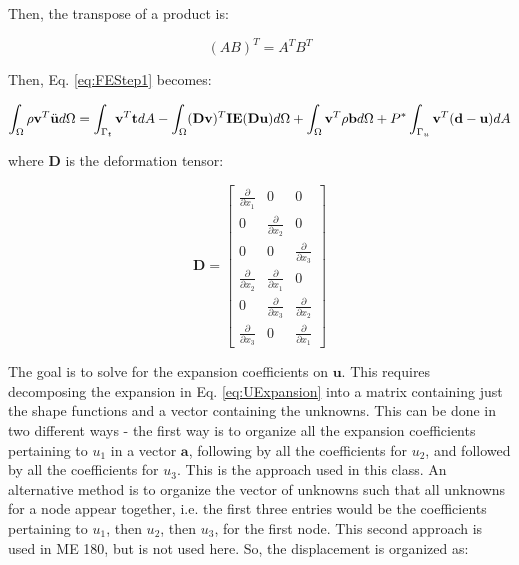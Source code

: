 \documentclass[10pt]{article}
\begin{document}
Then, the transpose of a product is:

\begin{equation}
(AB)^T=A^TB^T
\end{equation}


Then, Eq. \eqref{eq:FEStep1} becomes:

\begin{equation}
\int_{\Omega}\rho\textbf{v}^T\ddot{\textbf{u}}d\Omega=\int_{\Gamma_t}\textbf{v}^T\textbf{t}dA- \int_{\Omega}(\textbf{D}\textbf{v})^T\textbf{IE}(\textbf{D}\textbf{u})d\Omega +\int_{\Omega}\textbf{v}^T\rho\textbf{b}d\Omega+P^{*}\int_{\Gamma_u}\textbf{v}^T(\textbf{d}-\textbf{u})dA\\
\end{equation}

where \(\textbf{D}\) is the deformation tensor:

\begin{equation}
\label{eq:D}
\textbf{D}=\begin{bmatrix}\frac{\partial}{\partial x_1} & 0 & 0\\
0 & \frac{\partial}{\partial x_2} & 0\\
0 & 0 & \frac{\partial}{\partial x_3}\\
\frac{\partial}{\partial x_2} & \frac{\partial}{\partial x_1} & 0\\
0 & \frac{\partial}{\partial x_3} & \frac{\partial}{\partial x_2}\\
\frac{\partial}{\partial x_3} & 0 & \frac{\partial}{\partial x_1}\end{bmatrix}
\end{equation}

The goal is to solve for the expansion coefficients on \(\textbf{u}\). This requires decomposing the expansion in Eq. \eqref{eq:UExpansion} into a matrix containing just the shape functions and a vector containing the unknowns. This can be done in two different ways - the first way is to organize all the expansion coefficients pertaining to \(u_1\) in a vector \(\textbf{a}\), following by all the coefficients for \(u_2\), and followed by all the coefficients for \(u_3\). This is the approach used in this class. An alternative method is to organize the vector of unknowns such that all unknowns for a node appear together, i.e. the first three entries would be the coefficients pertaining to \(u_1\), then \(u_2\), then \(u_3\), for the first node. This second approach is used in ME 180, but is not used here. So, the displacement is organized as:
\end{document}
